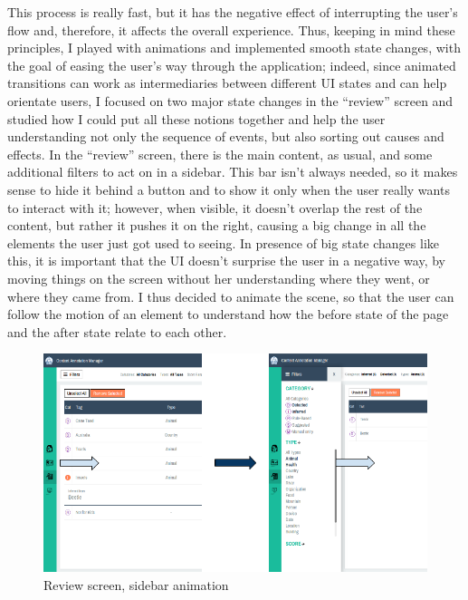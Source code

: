 \documentclass[12pt,oneside,svgnames]{memoir}
\begin{document}
This process is really fast, but it has the negative effect of
interrupting the user's flow and, therefore, it affects the overall
experience. Thus, keeping in mind these principles, I played with
animations and implemented smooth state changes, with the goal of easing
the user's way through the application; indeed, since animated
transitions can work as intermediaries between different UI states and
can help orientate users, I focused on two major state changes in the
``review'' screen and studied how I could put all these notions together
and help the user understanding not only the sequence of events, but
also sorting out causes and effects. In the ``review'' screen, there is
the main content, as usual, and some additional filters to act on in a
sidebar. This bar isn't always needed, so it makes sense to hide it
behind a button and to show it only when the user really wants to
interact with it; however, when visible, it doesn't overlap the rest of
the content, but rather it pushes it on the right, causing a big change
in all the elements the user just got used to seeing. In presence of big
state changes like this, it is important that the UI doesn't surprise
the user in a negative way, by moving things on the screen without her
understanding where they went, or where they came from. I thus decided
to animate the scene, so that the user can follow the motion of an
element to understand how the before state of the page and the after
state relate to each other.

\begin{figure}[htbp]
\centering
\includegraphics{./src/img/review-sidebar-animation.png}
\caption{Review screen, sidebar animation}
\end{figure}
\end{document}
